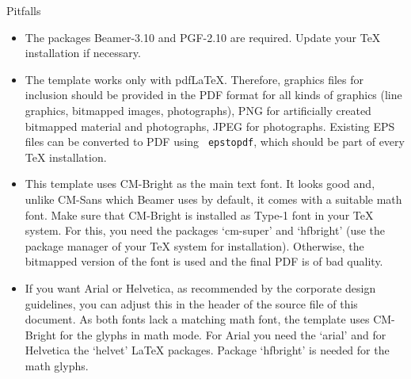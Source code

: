 
\begin{frame}[allowframebreaks=0.8]{Pitfalls}
  \begin{itemize}
    \item The packages Beamer-3.10 and PGF-2.10 are required. Update your \TeX{}
      installation if necessary.
    \item The template works only with pdf\LaTeX{}. Therefore, graphics files
      for inclusion should be provided in the PDF format for all kinds of
      graphics (line graphics, bitmapped images, photographs), PNG for
      artificially created bitmapped material and photographs, JPEG for
      photographs. Existing EPS files can be converted to PDF using {\tt
      epstopdf}, which should be part of every \TeX{} installation.
    \item This template uses \alert{CM-Bright} as the main text font. It looks
      good and, unlike CM-Sans which Beamer uses by default, it comes with a
      suitable math font. Make sure that CM-Bright is installed as Type-1 font
      in your \TeX{} system. For this, you need the packages `cm-super' and
      `hfbright' (use the package manager of your \TeX{} system for
      installation). Otherwise, the bitmapped version of the font is used and
      the final PDF is of bad quality.
    \item If you want Arial or Helvetica, as recommended by the corporate design
      guidelines, you can adjust this in the header of the source file of this
      document. As both fonts lack a matching math font, the template uses
      CM-Bright for the glyphs in math mode. For Arial you need the `arial' and
      for Helvetica the `helvet' \LaTeX{} packages. Package `hfbright' is needed
      for the math glyphs.
  \end{itemize}
\end{frame}

